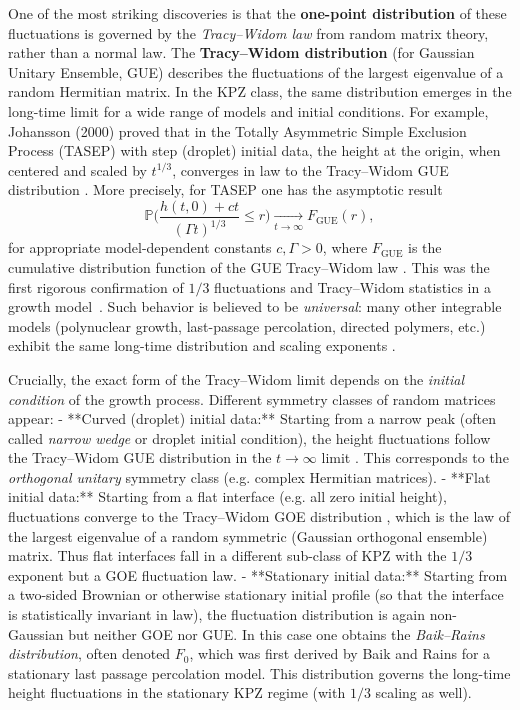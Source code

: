 \documentclass[letterpaper,11pt,oneside,reqno]{article}
\numberwithin{equation}{section}
\theoremstyle{definition}
\begin{document}
One of the most striking discoveries is that the \textbf{one-point distribution} of these fluctuations is governed by the \emph{Tracy–Widom law} from random matrix theory, rather than a normal law. The \textbf{Tracy–Widom distribution} (for Gaussian Unitary Ensemble, GUE) describes the fluctuations of the largest eigenvalue of a random Hermitian matrix. In the KPZ class, the same distribution emerges in the long-time limit for a wide range of models and initial conditions. For example, Johansson (2000) proved that in the Totally Asymmetric Simple Exclusion Process (TASEP) with step (droplet) initial data, the height at the origin, when centered and scaled by $t^{1/3}$, converges in law to the Tracy–Widom GUE distribution \cite{remenik2023integrable}. More precisely, for TASEP one has the asymptotic result
\[ \mathbb{P}\!\Big( \frac{h(t,0)+ct}{(\Gamma t)^{1/3}} \le r \Big) \xrightarrow[t\to\infty]{} F_{\mathrm{GUE}}(r), \]
for appropriate model-dependent constants $c,\Gamma>0$, where $F_{\mathrm{GUE}}$ is the cumulative distribution function of the GUE Tracy–Widom law \cite{remenik2023integrable}. This was the first rigorous confirmation of $1/3$ fluctuations and Tracy–Widom statistics in a growth model \cite{johansson2000shape}. Such behavior is believed to be \emph{universal}: many other integrable models (polynuclear growth, last-passage percolation, directed polymers, etc.) exhibit the same long-time distribution and scaling exponents \cite{johansson2000shape}.

Crucially, the exact form of the Tracy–Widom limit depends on the \emph{initial condition} of the growth process. Different symmetry classes of random matrices appear:
- **Curved (droplet) initial data:** Starting from a narrow peak (often called \emph{narrow wedge} or droplet initial condition), the height fluctuations follow the Tracy–Widom GUE distribution in the $t\to\infty$ limit \cite{remenik2023integrable}. This corresponds to the \emph{orthogonal unitary} symmetry class (e.g. complex Hermitian matrices).
- **Flat initial data:** Starting from a flat interface (e.g. all zero initial height), fluctuations converge to the Tracy–Widom GOE distribution \cite{remenik2023integrable}, which is the law of the largest eigenvalue of a random symmetric (Gaussian orthogonal ensemble) matrix. Thus flat interfaces fall in a different sub-class of KPZ with the $1/3$ exponent but a GOE fluctuation law.
- **Stationary initial data:** Starting from a two-sided Brownian or otherwise stationary initial profile (so that the interface is statistically invariant in law), the fluctuation distribution is again non-Gaussian but neither GOE nor GUE. In this case one obtains the \emph{Baik–Rains distribution}, often denoted $F_0$, which was first derived by Baik and Rains for a stationary last passage percolation model. This distribution governs the long-time height fluctuations in the stationary KPZ regime (with $1/3$ scaling as well).
\end{document}
